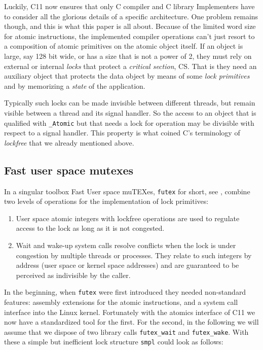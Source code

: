 Luckily, C11 now ensures that only C compiler and C library
Implementers have to consider all the glorious details of a
specific architecture. One problem remains though, and this is what
this paper is all about. Because of the limited word size for
atomic instructions, the implemented compiler operations can't just
resort to a composition of atomic primitives on the atomic object
itself. If an object is large, say 128 bit wide, or has a size that
is not a power of 2, they must rely on external or internal \emph{locks}
that protect a \emph{critical section}, CS. That is they need an
auxiliary object that protects the data object by means of some
\emph{lock primitives} and by memorizing a \emph{state} of the application.

Typically such locks can be made invisible between different
threads, but remain visible between a thread and its signal
handler. So the access to an object that is qualified with
\texttt{\_Atomic} but that needs a lock for operation may be divisible with
respect to a signal handler. This property is what coined C's
terminology of \emph{lockfree} that we already mentioned above.


\subsection{Fast user space mutexes}
\label{sec-2-3}

In a singular toolbox Fast User space muTEXes, \texttt{futex} for short,
see \cite{Hutton02fuss,hart09}, combine two levels of operations
for the implementation of lock primitives:\itemadjust

\begin{enumerate}
\item User space atomic integers with lockfree operations are used to
regulate access to the lock as long as it is not congested.\itemadjust

\item Wait and wake-up system calls resolve conflicts when the lock is
under congestion by multiple threads or processes. They relate
to such integers by address (user space or kernel space
addresses) and are guaranteed to be perceived as indivisible by
the caller.\itemadjust
\end{enumerate}

In the beginning, when \texttt{futex} were first introduced they needed
non-standard features: assembly extensions for the atomic
instructions, and a system call interface into the Linux
kernel. Fortunately with the atomics interface of C11 we now have
a standardized tool for the first. For the second, in the
following we will assume that we dispose of two library calls
\texttt{futex\_wait} and \texttt{futex\_wake}. With these a simple but
inefficient lock structure \texttt{smpl} could look as follows:


